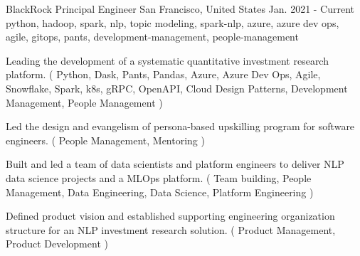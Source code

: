 \cventry
    {BlackRock} %
    {Principal Engineer} %
    {San Francisco, United States} %
    {Jan. 2021 - Current} %
    { python, hadoop, spark, nlp, topic modeling, spark-nlp, azure, azure dev ops, agile, gitops, pants, development-management, people-management} %
    {
    \begin{cvitems} %
       \item { Leading the development of a systematic quantitative investment research platform. ( Python, Dask, Pants, Pandas, Azure, Azure Dev Ops, Agile, Snowflake, Spark, k8s, gRPC, OpenAPI, Cloud Design Patterns, Development Management, People Management ) }
       \item { Led the design and evangelism of persona-based upskilling program for software engineers. ( People Management, Mentoring ) }
       \item { Built and led a team of data scientists and platform engineers to deliver NLP data science projects and a MLOps platform. ( Team building, People Management, Data Engineering, Data Science, Platform Engineering ) }
       \item { Defined product vision and established supporting engineering organization structure for an NLP investment research solution. ( Product Management, Product Development ) }
    \end{cvitems}
    }
